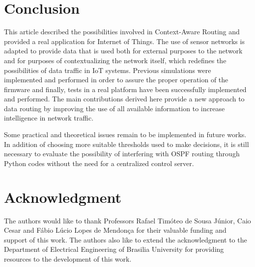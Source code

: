 \section{Conclusion}

This article described the possibilities involved in Context-Aware Routing and provided a real application for Internet of Things. The use of sensor networks is adapted to provide data that is used both for external purposes to the network and for purposes of contextualizing the network itself, which redefines the possibilities of data traffic in IoT systems. Previous simulations were implemented and performed in order to assure the proper operation of the firmware and finally, tests in a real platform have been successfully implemented and performed. The main contributions derived here provide a new approach to data routing by improving the use of all available information to increase intelligence in network traffic.

Some practical and theoretical issues remain to be implemented in future works. In addition of choosing more suitable thresholds used to make decisions, it is still necessary to evaluate the possibility of interfering with OSPF routing through Python codes without the need for a centralized control server.

\section*{Acknowledgment}
The authors would like to thank Professors Rafael Timóteo de Sousa Júnior, Caio Cesar and Fábio Lúcio Lopes de Mendonça for their valuable funding and support of this work. The authors also like to extend the acknowledgment to the Department of Electrical Engineering of Brasilia University for providing resources to the development of this work.

